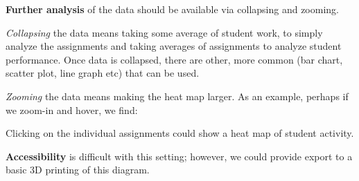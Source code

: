 \documentclass{techbrief}
\begin{document}
\begin{xframe}
    \textbf{Further analysis} of the data should be available via 
    collapsing and zooming. 
    
    \textit{Collapsing} the data means taking some average of student work, to simply
    analyze the assignments and taking averages of assignments to analyze student
    performance. Once data is collapsed, there are other, more common (bar chart,
    scatter plot, line graph etc) that can be used.
    


    \textit{Zooming} the data means making the heat map larger. 
    As an example, perhaps if we zoom-in and hover, we find:
    \begin{center}
    \end{center}
    Clicking on the individual assignments could show a heat map of student activity.
\end{xframe}

\begin{xframe}
\textbf{Accessibility} is difficult with this setting; however, we could provide export to a basic 3D printing of this diagram. 
\end{xframe}
\end{document}
